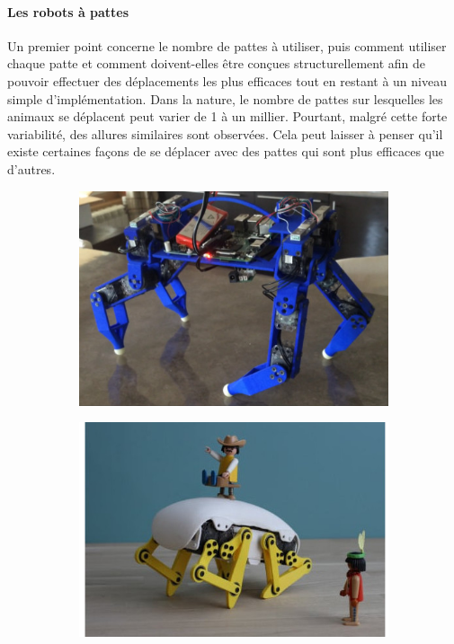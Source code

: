             \paragraph{Les robots à pattes}\label{sec:mob_patte}
                Un premier point concerne le nombre de pattes à utiliser, puis comment utiliser chaque patte et comment doivent-elles être conçues structurellement afin de pouvoir effectuer des déplacements les plus efficaces tout en restant à un niveau simple d'implémentation. 
                Dans la nature, le nombre de pattes sur lesquelles les animaux se déplacent peut varier de 1 à un millier. Pourtant, malgré cette forte variabilité, des allures similaires sont observées. Cela peut laisser à penser qu'il existe certaines façons de se déplacer avec des pattes qui sont plus efficaces que d'autres.
                \begin{figure}[!h]
                    \centering
                    \begin{subfigure}{0.495\linewidth}
                    \includegraphics[width=\linewidth]{Figures/bot-quattro.jpg}
                    \label{fig:quattro}
                    \end{subfigure}
                    \begin{subfigure}{0.495\linewidth}
                    \includegraphics[width=\linewidth]{Figures/bot-doggy.jpg}

\end{subfigure}
\end{figure}
